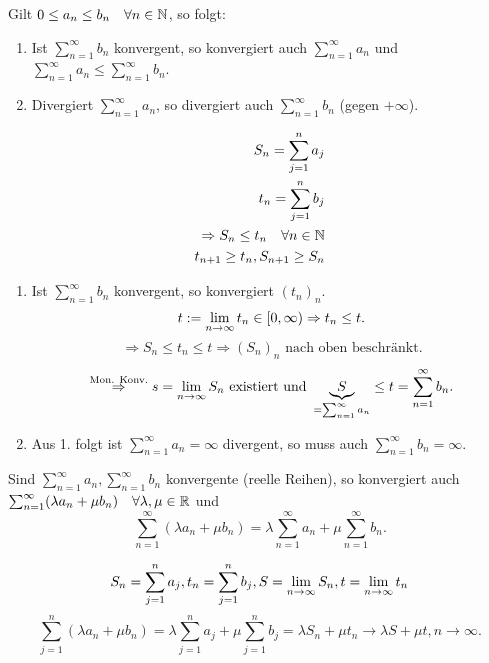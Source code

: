\begin{satz}
	Gilt \(0\leq a_n \leq b_n \quad \forall n\in\mathbb{N} \), so folgt:
	\begin{enumerate}
		\item Ist \( \sum_{n=1}^{\infty}b_n \) konvergent, so konvergiert auch \( \sum_{n=1}^{\infty}a_n \) und \( \sum_{n=1}^{\infty} a_n \leq \sum_{n=1}^{\infty}b_n \).
		\item Divergiert \( \sum_{n=1}^{\infty}a_n \), so divergiert auch \( \sum_{n=1}^{\infty}b_n \) (gegen \(+\infty\)).
	\end{enumerate}
\end{satz}
\begin{bew}
	\begin{align*}
		S_n = \sum_{j=1}^{n}a_j\\
		t_n = \sum_{j=1}^{n}b_j\\
		\Rightarrow S_n \leq t_n \quad \forall n\in\mathbb{N}\\
		t_{n+1}\geq t_n, S_{n+1}\geq S_n
	\end{align*}
	\begin{enumerate}
		\item Ist \( \sum_{n=1}^{\infty}b_n \) konvergent, so konvergiert \((t_n)_n\).\\
		\[ t:= \lim\limits_{n\rightarrow\infty}t_n\in [0,\infty) \Rightarrow t_n \leq t. \]
		\[ \Rightarrow S_n \leq t_n \leq t \Rightarrow (S_n)_n \text{ nach oben beschränkt.} \]
		\[ \overset{\text{Mon. Konv.}}{\Rightarrow} s = \lim\limits_{n\rightarrow\infty} S_n \text{ existiert und } \underbrace{S}_{= \sum_{n=1}^{\infty}a_n} \leq t = \sum_{n=1}^{\infty} b_n. \]
		\item Aus 1. folgt ist \( \sum_{n=1}^{\infty}a_n =\infty \) divergent, so muss auch \( \sum_{n=1}^{\infty}b_n = \infty \).
	\end{enumerate}
\end{bew}
\begin{satz}
	Sind \( \sum_{n=1}^{\infty}a_n, \sum_{n=1}^{\infty}b_n \) konvergente (reelle Reihen), so konvergiert auch \( \sum_{n=1}^{\infty}(\lambda a_n + \mu b_n) \quad \forall \lambda, \mu \in\mathbb{R} \) und 
	\[ \sum_{n=1}^{\infty} (\lambda a_n + \mu b_n) = \lambda \sum_{n=1}^{\infty}a_n + \mu \sum_{n=1}^{\infty}b_n. \]
\end{satz}
\begin{bew}
	\[ S_n = \sum_{j=1}^{n}a_j, t_n = \sum_{j=1}^{n}b_j, S = \lim\limits_{n\rightarrow\infty}S_n, t = \lim\limits_{n\rightarrow\infty}t_n \]
	\[ \sum_{j=1}^{n}(\lambda a_n + \mu b_n) = \lambda\sum_{j=1}^{n}a_j + \mu \sum_{j=1}^{n}b_j = \lambda S_n + \mu t_n \rightarrow \lambda S + \mu t, n\rightarrow\infty. \]
\end{bew}
